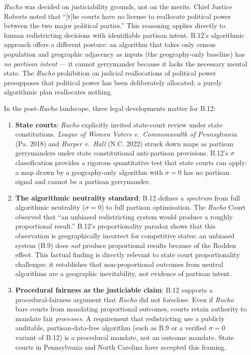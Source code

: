 \emph{Rucho} was decided on justiciability grounds, not on the merits.
Chief Justice Roberts noted that ``[t]he courts have no license to reallocate
political power between the two major political parties.''
This reasoning applies directly to human redistricting decisions with
identifiable partisan intent.
B.12's algorithmic approach offers a different posture: an algorithm that
takes only census population and geographic adjacency as inputs (the
geography-only baseline) has \emph{no partisan intent} --- it cannot
gerrymander because it lacks the necessary mental state.
The \emph{Rucho} prohibition on judicial reallocations of political power
presupposes that political power has been deliberately allocated;
a purely algorithmic plan reallocates nothing.

In the post-\emph{Rucho} landscape, three legal developments matter for B.12:

\begin{enumerate}
  \item \textbf{State courts}: \emph{Rucho} explicitly invited state-court
    review under state constitutions. \emph{League of Women Voters v.\ Commonwealth
    of Pennsylvania} (Pa. 2018) and \emph{Harper v.\ Hall} (N.C. 2022) struck
    down maps as partisan gerrymanders under state constitutional anti-partisan
    provisions.
    B.12's $\sigma$ classification provides a rigorous quantitative test that
    state courts can apply: a map drawn by a geography-only algorithm with
    $\sigma = 0$ has no partisan signal and cannot be a partisan gerrymander.

  \item \textbf{The algorithmic neutrality standard}: B.12 defines a
    \emph{spectrum} from full algorithmic neutrality ($\sigma = 0$) to
    full partisan optimisation.
    The \emph{Rucho} Court observed that ``an unbiased redistricting system would
    produce a roughly proportional result.''
    B.12's proportionality paradox shows that this observation is geographically
    incorrect for competitive states: an unbiased system (B.9) does \emph{not}
    produce proportional results because of the Rodden effect.
    This factual finding is directly relevant to state court proportionality
    challenges: it establishes that non-proportional outcomes from neutral
    algorithms are a geographic inevitability, not evidence of partisan intent.

  \item \textbf{Procedural fairness as the justiciable claim}: B.12 supports
    a procedural-fairness argument that \emph{Rucho} did not foreclose.
    Even if \emph{Rucho} bars courts from mandating proportional outcomes,
    courts retain authority to mandate fair \emph{processes}.
    A requirement that redistricting use a publicly auditable, partisan-data-free
    algorithm (such as B.9 or a verified $\sigma = 0$ variant of B.12) is a
    procedural mandate, not an outcome mandate.
    State courts in Pennsylvania and North Carolina have accepted this framing.
\end{enumerate}

